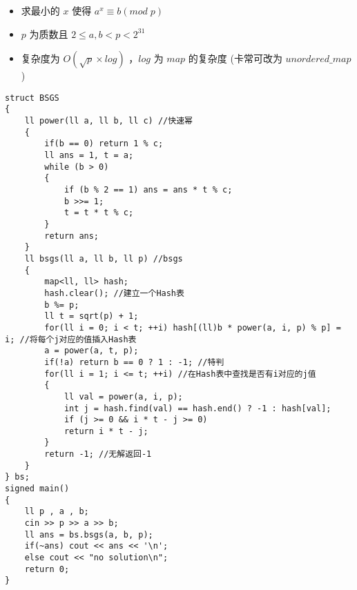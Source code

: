 \documentclass[E:/GsjzTle/main/main.tex]{subfiles}
\begin{document}
\begin{itemize}
\item
  求最小的 \(x\) 使得 \(a^x\equiv b(mod\;p)\)
\item
  \(p\) 为质数且 \(2\le a,b < p<2^{31}\)
\item
  复杂度为 \(O(\sqrt{p}×log)\) ，\(log\) 为 \(map\) 的复杂度 (卡常可改为
  \(unordered\_map\))
\end{itemize}

\begin{lstlisting}
struct BSGS
{
	ll power(ll a, ll b, ll c) //快速幂
	{
		if(b == 0) return 1 % c;
		ll ans = 1, t = a;
		while (b > 0)
		{
			if (b % 2 == 1) ans = ans * t % c;
			b >>= 1;
			t = t * t % c;
		}
		return ans;
	}
	ll bsgs(ll a, ll b, ll p) //bsgs
	{
		map<ll, ll> hash;
		hash.clear(); //建立一个Hash表
		b %= p;
		ll t = sqrt(p) + 1;
		for(ll i = 0; i < t; ++i) hash[(ll)b * power(a, i, p) % p] = i; //将每个j对应的值插入Hash表
		a = power(a, t, p);
		if(!a) return b == 0 ? 1 : -1; //特判
		for(ll i = 1; i <= t; ++i) //在Hash表中查找是否有i对应的j值
		{
			ll val = power(a, i, p);
			int j = hash.find(val) == hash.end() ? -1 : hash[val];
			if (j >= 0 && i * t - j >= 0)
			return i * t - j;
		}
		return -1; //无解返回-1
	}
} bs;
signed main()
{
	ll p , a , b;
	cin >> p >> a >> b;
	ll ans = bs.bsgs(a, b, p);
	if(~ans) cout << ans << '\n';
	else cout << "no solution\n";
	return 0;
}
\end{lstlisting}
\end{document}
